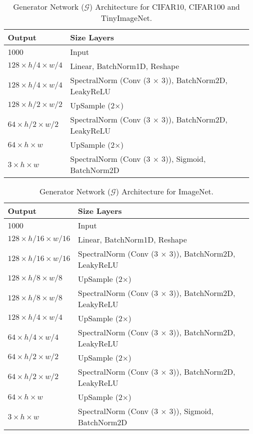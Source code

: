 \documentclass{article} %
\begin{document}
\begin{table}[h]
\centering
\caption{Generator Network ($\mathcal{G}$) Architecture for CIFAR10, CIFAR100 and TinyImageNet.}
\begin{adjustbox}{width=0.8\linewidth}
\begin{tabular}{@{}ll@{}}
\toprule
Output          & \textbf{Size   Layers}                              \\ \midrule
1000            & Input                                 \\
$128 \times h/4 \times w/4$ & Linear, BatchNorm1D, Reshape                        \\
$128 \times h/4 \times w/4$ & SpectralNorm (Conv (3 × 3)), BatchNorm2D, LeakyReLU \\
$128 \times h/2 \times w/2$ & UpSample (2×)                                       \\
$64 \times h/2 \times w/2$  & SpectralNorm (Conv (3 × 3)), BatchNorm2D, LeakyReLU \\
$64 \times h \times w$     & UpSample (2×)                                       \\
$3 \times h \times w$      & SpectralNorm (Conv (3 × 3)), Sigmoid, BatchNorm2D      \\ \bottomrule
\end{tabular}
\end{adjustbox}
\label{tab:g_arch}
\end{table}
\begin{table}[h]
\centering
\caption{Generator Network ($\mathcal{G}$) Architecture for ImageNet.}
\begin{adjustbox}{width=0.8\linewidth}
\begin{tabular}{@{}ll@{}}
\toprule
Output          & \textbf{Size   Layers}                              \\ \midrule
1000            & Input                                 \\
$128 \times h/16 \times w/16$ & Linear, BatchNorm1D, Reshape                        \\
$128 \times h/16 \times w/16$ & SpectralNorm (Conv (3 × 3)), BatchNorm2D, LeakyReLU \\
$128 \times h/8 \times w/8$ & UpSample (2×) \\                    
$128 \times h/8 \times w/8$ & SpectralNorm (Conv (3 × 3)), BatchNorm2D, LeakyReLU \\
$128 \times h/4 \times w/4$ & UpSample (2×) \\                      
$64 \times h/4 \times w/4$ & SpectralNorm (Conv (3 × 3)), BatchNorm2D, LeakyReLU \\
$64 \times h/2 \times w/2$ & UpSample (2×) \\
$64 \times h/2 \times w/2$  & SpectralNorm (Conv (3 × 3)), BatchNorm2D, LeakyReLU \\
$64 \times h \times w$     & UpSample (2×)                                       \\
$3 \times h \times w$      & SpectralNorm (Conv (3 × 3)), Sigmoid, BatchNorm2D      \\ \bottomrule
\end{tabular}
\end{adjustbox}
\label{tab:g_arch_in}
\end{table}
\end{document}
